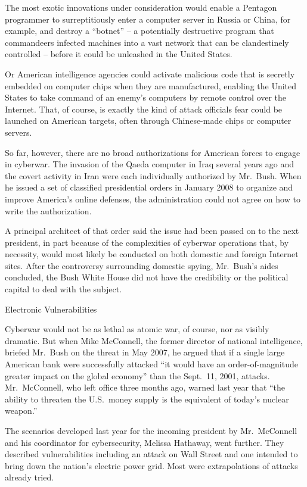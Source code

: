 \documentclass[12pt,a4paper,onecolumn]{article}
\begin{document}
The most exotic innovations under consideration would enable a Pentagon programmer to
surreptitiously enter a computer server in Russia or China, for example, and destroy a ``botnet'' --
a potentially destructive program that commandeers infected machines into a vast network that can be
clandestinely controlled -- before it could be unleashed in the United States.

Or American intelligence agencies could activate malicious code that is secretly embedded on
computer chips when they are manufactured, enabling the United States to take command of an enemy's
computers by remote control over the Internet. That, of course, is exactly the kind of attack
officials fear could be launched on American targets, often through Chinese-made chips or computer
servers.

So far, however, there are no broad authorizations for American forces to engage in cyberwar. The
invasion of the Qaeda computer in Iraq several years ago and the covert activity in Iran were each
individually authorized by Mr.~Bush. When he issued a set of classified presidential orders in
January 2008 to organize and improve America's online defenses, the administration could not agree
on how to write the authorization.

A principal architect of that order said the issue had been passed on to the next president, in part
because of the complexities of cyberwar operations that, by necessity, would most likely be
conducted on both domestic and foreign Internet sites. After the controversy surrounding domestic
spying, Mr.~Bush's aides concluded, the Bush White House did not have the credibility or the
political capital to deal with the subject.

Electronic Vulnerabilities

Cyberwar would not be as lethal as atomic war, of course, nor as visibly dramatic. But when Mike
McConnell, the former director of national intelligence, briefed Mr.~Bush on the threat in May 2007,
he argued that if a single large American bank were successfully attacked ``it would have an
order-of-magnitude greater impact on the global economy'' than the Sept.~11, 2001, attacks.
Mr.~McConnell, who left office three months ago, warned last year that ``the ability to threaten the
U.S.~money supply is the equivalent of today's nuclear weapon.''

The scenarios developed last year for the incoming president by Mr.~McConnell and his coordinator
for cybersecurity, Melissa Hathaway, went further. They described vulnerabilities including an
attack on Wall Street and one intended to bring down the nation's electric power grid. Most were
extrapolations of attacks already tried.
\end{document}
